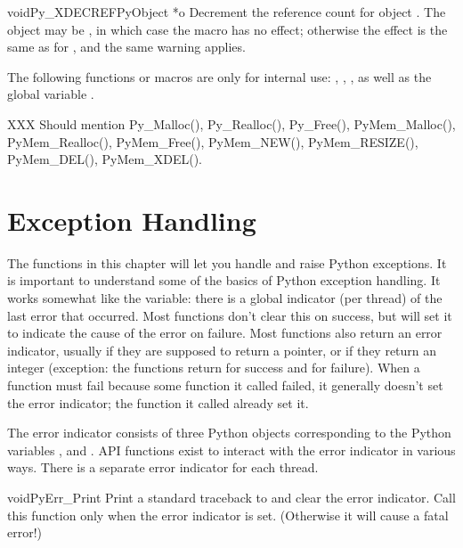 \documentclass{manual}
\begin{document}
\begin{cfuncdesc}{void}{Py_XDECREF}{PyObject *o}
Decrement the reference count for object .  The object may be
\NULL{}, in which case the macro has no effect; otherwise the effect
is the same as for , and the same warning
applies.
\end{cfuncdesc}

The following functions or macros are only for internal use:
, ,
, as well as the global variable
.

XXX Should mention Py_Malloc(), Py_Realloc(), Py_Free(),
PyMem_Malloc(), PyMem_Realloc(), PyMem_Free(), PyMem_NEW(),
PyMem_RESIZE(), PyMem_DEL(), PyMem_XDEL().


\chapter{Exception Handling \label{exceptionHandling}}

The functions in this chapter will let you handle and raise Python
exceptions.  It is important to understand some of the basics of
Python exception handling.  It works somewhat like the \UNIX{}
 variable: there is a global indicator (per thread) of the
last error that occurred.  Most functions don't clear this on success,
but will set it to indicate the cause of the error on failure.  Most
functions also return an error indicator, usually \NULL{} if they are
supposed to return a pointer, or  if they return an integer
(exception: the  functions return  for
success and  for failure).  When a function must fail because
some function it called failed, it generally doesn't set the error
indicator; the function it called already set it.

The error indicator consists of three Python objects corresponding to
the Python variables ,  and
.  API functions exist to interact with the
error indicator in various ways.  There is a separate error indicator
for each thread.


\begin{cfuncdesc}{void}{PyErr_Print}{}
Print a standard traceback to  and clear the error
indicator.  Call this function only when the error indicator is set.
(Otherwise it will cause a fatal error!)
\end{cfuncdesc}
\end{document}

